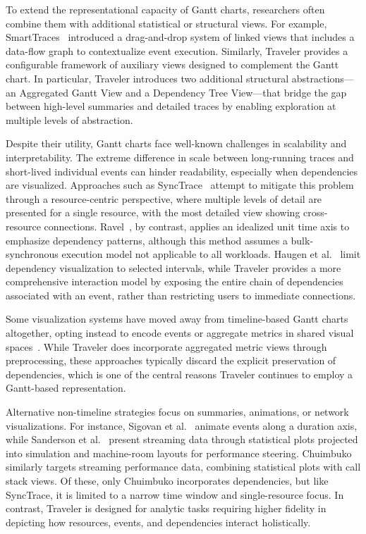\begin{refsection}
To extend the representational capacity of Gantt charts, researchers often combine them with additional statistical or structural views. For example, SmartTraces~\cite{Osmari2014SmartTraces} introduced a drag-and-drop system of linked views that includes a data-flow graph to contextualize event execution. Similarly, Traveler provides a configurable framework of auxiliary views designed to complement the Gantt chart. In particular, Traveler introduces two additional structural abstractions—an Aggregated Gantt View and a Dependency Tree View—that bridge the gap between high-level summaries and detailed traces by enabling exploration at multiple levels of abstraction.

Despite their utility, Gantt charts face well-known challenges in scalability and interpretability. The extreme difference in scale between long-running traces and short-lived individual events can hinder readability, especially when dependencies are visualized. Approaches such as SyncTrace~\cite{karran2013synctrace} attempt to mitigate this problem through a resource-centric perspective, where multiple levels of detail are presented for a single resource, with the most detailed view showing cross-resource connections. Ravel~\cite{isaacs2014combing}, by contrast, applies an idealized unit time axis to emphasize dependency patterns, although this method assumes a bulk-synchronous execution model not applicable to all workloads. Haugen et al.~\cite{Haugen2015} limit dependency visualization to selected intervals, while Traveler provides a more comprehensive interaction model by exposing the entire chain of dependencies associated with an event, rather than restricting users to immediate connections.

Some visualization systems have moved away from timeline-based Gantt charts altogether, opting instead to encode events or aggregate metrics in shared visual spaces~\cite{muelder2009visual, muelder2016visual, fujiwara2018visual, li2019visual, kesavan2020visual}. While Traveler does incorporate aggregated metric views through preprocessing, these approaches typically discard the explicit preservation of dependencies, which is one of the central reasons Traveler continues to employ a Gantt-based representation.

Alternative non-timeline strategies focus on summaries, animations, or network visualizations. For instance, Sigovan et al.~\cite{sigovan2013visualizing} animate events along a duration axis, while Sanderson et al.~\cite{sanderson2018coupling} present streaming data through statistical plots projected into simulation and machine-room layouts for performance steering. Chuimbuko~\cite{kelly2020chimbuko} similarly targets streaming performance data, combining statistical plots with call stack views. Of these, only Chuimbuko incorporates dependencies, but like SyncTrace, it is limited to a narrow time window and single-resource focus. In contrast, Traveler is designed for analytic tasks requiring higher fidelity in depicting how resources, events, and dependencies interact holistically.


\end{refsection}
